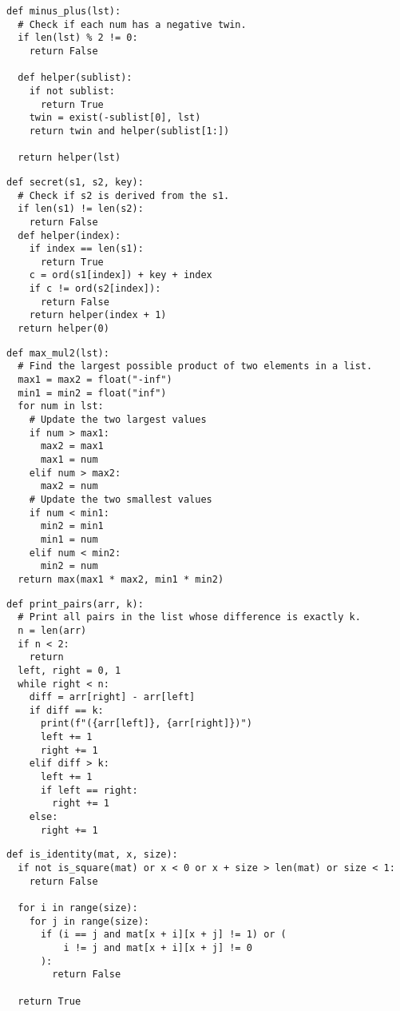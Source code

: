 \documentclass[11pt]{article}
\begin{document}
\begin{multicols}{2}
\begin{lstlisting}
def minus_plus(lst):
  # Check if each num has a negative twin.
  if len(lst) % 2 != 0:
    return False

  def helper(sublist):
    if not sublist:
      return True
    twin = exist(-sublist[0], lst)
    return twin and helper(sublist[1:])

  return helper(lst)
\end{lstlisting}
\begin{lstlisting}
def secret(s1, s2, key):
  # Check if s2 is derived from the s1.
  if len(s1) != len(s2):
    return False
  def helper(index):
    if index == len(s1):
      return True
    c = ord(s1[index]) + key + index
    if c != ord(s2[index]):
      return False
    return helper(index + 1)
  return helper(0)
\end{lstlisting}
\end{multicols}

\vspace{-0.25cm}

\begin{multicols}{2}
\begin{lstlisting}
def max_mul2(lst):
  # Find the largest possible product of two elements in a list.
  max1 = max2 = float("-inf")
  min1 = min2 = float("inf")
  for num in lst:
    # Update the two largest values
    if num > max1:
      max2 = max1
      max1 = num
    elif num > max2:
      max2 = num
    # Update the two smallest values
    if num < min1:
      min2 = min1
      min1 = num
    elif num < min2:
      min2 = num
  return max(max1 * max2, min1 * min2)
\end{lstlisting}
\begin{lstlisting}
def print_pairs(arr, k):
  # Print all pairs in the list whose difference is exactly k.
  n = len(arr)
  if n < 2:
    return
  left, right = 0, 1
  while right < n:
    diff = arr[right] - arr[left]
    if diff == k:
      print(f"({arr[left]}, {arr[right]})")
      left += 1
      right += 1
    elif diff > k:
      left += 1
      if left == right:
        right += 1
    else:
      right += 1
\end{lstlisting}
\end{multicols}

\begin{lstlisting}
def is_identity(mat, x, size):
  if not is_square(mat) or x < 0 or x + size > len(mat) or size < 1:
    return False

  for i in range(size):
    for j in range(size):
      if (i == j and mat[x + i][x + j] != 1) or (
          i != j and mat[x + i][x + j] != 0
      ):
        return False

  return True
\end{lstlisting}
\end{document}
